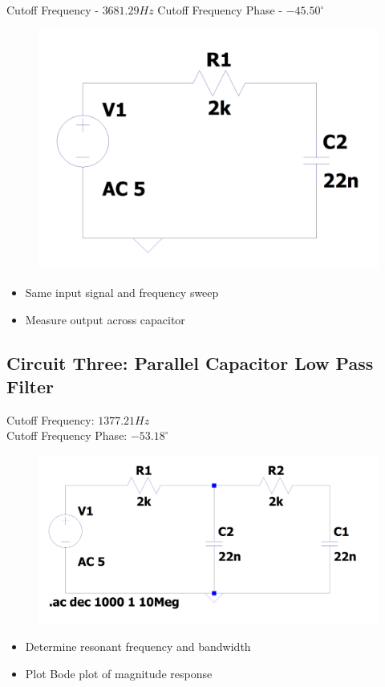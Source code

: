 \documentclass[12pt]{article}
\begin{document}
Cutoff Frequency - $3681.29Hz$
Cutoff Frequency Phase - $-45.50^\circ$
\begin{figure}[H]
	\includegraphics[width=\textwidth]{e6_02}
\end{figure}
\begin{itemize}
	\item Same input signal and frequency sweep
	\item Measure output across capacitor
\end{itemize}

\subsection{Circuit Three: Parallel Capacitor Low Pass Filter}
Cutoff Frequency: $1377.21Hz$\\
Cutoff Frequency Phase: $-53.18^\circ$\\

\begin{figure}[H]
	\includegraphics[width=\textwidth]{e6_03}
\end{figure}
\begin{itemize}
	\item Determine resonant frequency and bandwidth
	\item Plot Bode plot of magnitude response
\end{itemize}
\end{document}
